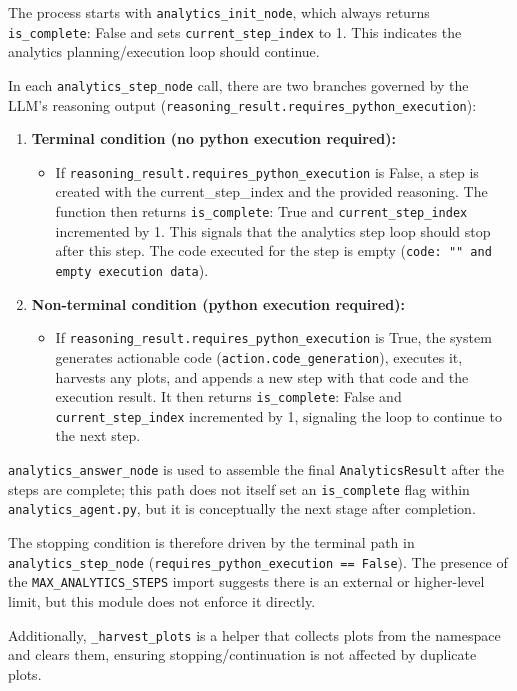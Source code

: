 The process starts with \texttt{analytics\_init\_node}, which always returns \texttt{is\_complete}: False and sets \texttt{current\_step\_index} to 1. This indicates the analytics planning/execution loop should continue.

In each \texttt{analytics\_step\_node} call, there are two branches governed by the LLM's reasoning output (\texttt{reasoning\_result.requires\_python\_execution}):
\begin{enumerate}
  \item \textbf{Terminal condition (no python execution required):}
    \begin{itemize}
      \item If \texttt{reasoning\_result.requires\_python\_execution} is False, a step is created with the current\_step\_index and the provided reasoning. The function then returns \texttt{is\_complete}: True and \texttt{current\_step\_index} incremented by 1. This signals that the analytics step loop should stop after this step. The code executed for the step is empty (\texttt{code: "" and empty execution data}).
    \end{itemize}
  \item \textbf{Non-terminal condition (python execution required):}
    \begin{itemize}
      \item If \texttt{reasoning\_result.requires\_python\_execution} is True, the system generates actionable code (\texttt{action.code\_generation}), executes it, harvests any plots, and appends a new step with that code and the execution result. It then returns \texttt{is\_complete}: False and \texttt{current\_step\_index} incremented by 1, signaling the loop to continue to the next step.
    \end{itemize}
\end{enumerate}

\texttt{analytics\_answer\_node} is used to assemble the final \texttt{AnalyticsResult} after the steps are complete; this path does not itself set an \texttt{is\_complete} flag within \texttt{analytics\_agent.py}, but it is conceptually the next stage after completion.

The stopping condition is therefore driven by the terminal path in \texttt{analytics\_step\_node} (\texttt{requires\_python\_execution == False}). The presence of the \texttt{MAX\_ANALYTICS\_STEPS} import suggests there is an external or higher-level limit, but this module does not enforce it directly.

Additionally, \texttt{\_harvest\_plots} is a helper that collects plots from the namespace and clears them, ensuring stopping/continuation is not affected by duplicate plots.
